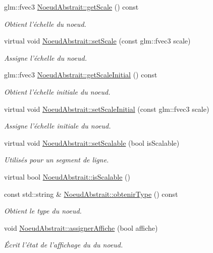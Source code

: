 \begin{DoxyCompactItemize}
glm\-::fvec3 \hyperlink{group__inf2990_ga153a0490acbbaeda4647496e51d37894}{Noeud\-Abstrait\-::get\-Scale} () const 
\begin{DoxyCompactList}\small\item\em Obtient l'échelle du noeud. \end{DoxyCompactList}\item 
virtual void \hyperlink{group__inf2990_gaef8fd99796f85418adac496160a3350b}{Noeud\-Abstrait\-::set\-Scale} (const glm\-::fvec3 scale)
\begin{DoxyCompactList}\small\item\em Assigne l'échelle du noeud. \end{DoxyCompactList}\item 
glm\-::fvec3 \hyperlink{group__inf2990_gab229ec2d195c9e9bfa1a4c0f80b582ca}{Noeud\-Abstrait\-::get\-Scale\-Initial} () const 
\begin{DoxyCompactList}\small\item\em Obtient l'échelle initiale du noeud. \end{DoxyCompactList}\item 
virtual void \hyperlink{group__inf2990_gae51f2e4da1ff9308a55324d4aafd72db}{Noeud\-Abstrait\-::set\-Scale\-Initial} (const glm\-::fvec3 scale)
\begin{DoxyCompactList}\small\item\em Assigne l'échelle initiale du noeud. \end{DoxyCompactList}\item 
virtual void \hyperlink{group__inf2990_gac84509676c191712e87dd99bab723d90}{Noeud\-Abstrait\-::set\-Scalable} (bool is\-Scalable)
\begin{DoxyCompactList}\small\item\em Utilisés pour un segment de ligne. \end{DoxyCompactList}\item 
virtual bool \hyperlink{group__inf2990_gaa764aeb7ced23c3c5ffd2b4d202f79fa}{Noeud\-Abstrait\-::is\-Scalable} ()
\item 
const std\-::string \& \hyperlink{group__inf2990_ga2df7c53ab456cc88bce73f7eb913e3e6}{Noeud\-Abstrait\-::obtenir\-Type} () const 
\begin{DoxyCompactList}\small\item\em Obtient le type du noeud. \end{DoxyCompactList}\item 
void \hyperlink{group__inf2990_gad5205d1e1b63fb66175a8580261d5eea}{Noeud\-Abstrait\-::assigner\-Affiche} (bool affiche)
\begin{DoxyCompactList}\small\item\em Écrit l'état de l'affichage du du noeud. \end{DoxyCompactList}\item 

\end{DoxyCompactItemize}
